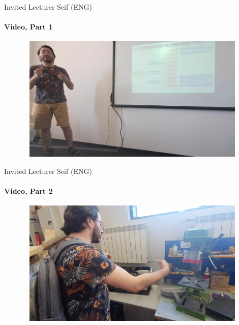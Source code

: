\documentclass[aspectratio=169]{beamer}
\newcommand{\fbckg}[1]{\usebackgroundtemplate{\texttt{[image: \#1]}}}%
\begin{document}
    \begin{frame}[t]{Invited Lecturer Seif (ENG)}
        \framesubtitle{Video, Part 1}
        \vspace{-0.6cm}
        \begin{figure}[H]
            \href{https://disk.yandex.ru/i/ZSzrG8Uh0G7yvg}{
                \centering\includegraphics[height=6cm,width=1\textwidth,keepaspectratio]{seif_manufactoring_1_video.png}}
            \label{fig:seif_manufactoring_1_video.png}
        \end{figure}
    \end{frame}
    
    \begin{frame}[t]{Invited Lecturer Seif (ENG)}
        \framesubtitle{Video, Part 2}
        \vspace{-0.6cm}
        \begin{figure}[H]
            \href{https://disk.yandex.ru/i/ocx0EwLLyuIUHg}{
                \centering\includegraphics[height=6cm,width=1\textwidth,keepaspectratio]{seif_manufactoring_2_video.png}}
            \label{fig:seif_manufactoring_2_video.png}
        \end{figure}
    \end{frame}


\fbckg{fibeamer/figs/last_page.png}
\frame[plain]{}
\end{document}
